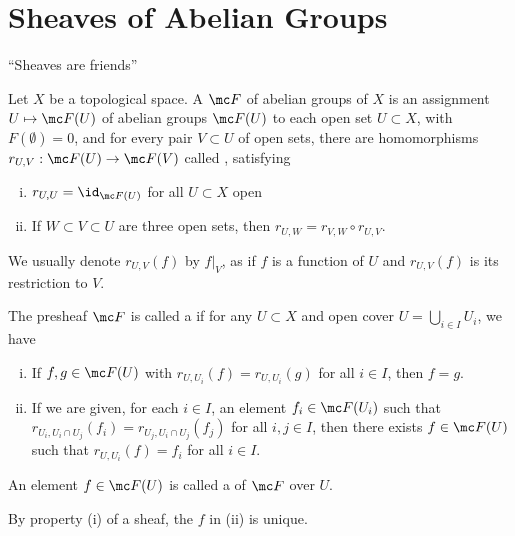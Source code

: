 \documentclass[11pt]{report}
\begin{document}
\section{Sheaves of Abelian Groups}
``Sheaves are friends''
\begin{defn}
    Let $X$ be a topological space. A  $\mc F$ of abelian groups of $X$ is an assignment $U \mapsto \mc F(U)$ of abelian groups $\mc F(U)$ to each open set $U \subset X$, with $F(\emptyset)=0$, and for every pair $V \subset U$ of open sets, there are homomorphisms $r_{U,V}: \mc F(U) \to \mc F(V)$ called , satisfying
    \begin{enumerate}[(i)]
        \item $r_{U,U}=\id_{\mc F(U)}$ for all $U \subset X$ open
        \item If $W \subset V \subset U$ are three open sets, then $r_{U,W}=r_{V,W} \circ r_{U,V}$.
    \end{enumerate}
     We usually denote $r_{U,V}(f)$ by $f|_V$, as if $f$ is a function of $U$ and $r_{U,V}(f)$ is its restriction to $V$.

     The presheaf $\mc F$ is called a  if for any $U \subset X$ and open cover $U=\bigcup_{i \in I}U_i$, we have
     \begin{enumerate}[(i)]
        \item If $f,g \in \mc F(U)$ with $r_{U,U_i}(f) = r_{U,U_i}(g)$ for all $i \in I$, then $f=g$.
        \item If we are given, for each $i \in I$, an element $f_i \in \mc F(U_i)$ such that $r_{U_i,U_i \cap U_j}(f_i)=r_{U_j,U_i\cap U_j}(f_j)$ for all $i,j \in I$, then there exists $f \in \mc F(U)$ such that $r_{U,U_i}(f)=f_i$ for all $i \in I$.
     \end{enumerate}
     An element $f \in \mc F(U)$ is called a  of $\mc F$ over $U$.
\end{defn}

\begin{rmk}
    By property (i) of a sheaf, the $f$ in (ii) is unique.
\end{rmk}
\end{document}
